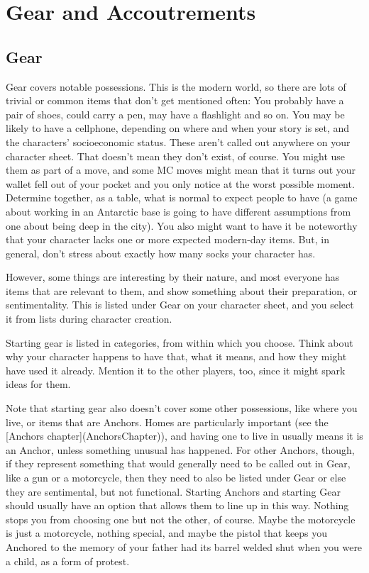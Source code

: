 \documentclass[
  oneside,
  statementpaper,
  9pt]{memoir}
\begin{document}
\newpage

\label{Gear and Accoutrements chapter}

\hypertarget{gear-and-accoutrements-1}{%
\chapter{Gear and Accoutrements}\label{gear-and-accoutrements-1}}

\hypertarget{gear}{%
\section{Gear}\label{gear}}

\begin{Player}

Gear covers notable possessions. This is the modern world, so there are lots of trivial or common items that don’t get mentioned often: You probably have a pair of shoes, could carry a pen, may have a flashlight and so on. You may be likely to have a cellphone, depending on where and when your story is set, and the characters' socioeconomic status. These aren’t called out anywhere on your character sheet. That doesn’t mean they don’t exist, of course. You might use them as part of a move, and some MC moves might mean that it turns out your wallet fell out of your pocket and you only notice at the worst possible moment. Determine together, as a table, what is normal to expect people to have (a game about working in an Antarctic base is going to have different assumptions from one about being deep in the city). You also might want to have it be noteworthy that your character lacks one or more expected modern-day items. But, in general, don’t stress about exactly how many socks your character has.

However, some things are interesting by their nature, and most everyone has items that are relevant to them, and show something about their preparation, or sentimentality. This is listed under Gear on your character sheet, and you select it from lists during character creation.

Starting gear is listed in categories, from within which you choose. Think about why your character happens to have that, what it means, and how they might have used it already. Mention it to the other players, too, since it might spark ideas for them.

Note that starting gear also doesn’t cover some other possessions, like where you live, or items that are Anchors. Homes are particularly important (see the [Anchors chapter](AnchorsChapter)), and having one to live in usually means it is an Anchor, unless something unusual has happened. For other Anchors, though, if they represent something that would generally need to be called out in Gear, like a gun or a motorcycle, then they need to also be listed under Gear or else they are sentimental, but not functional. Starting Anchors and starting Gear should usually have an option that allows them to line up in this way. Nothing stops you from choosing one but not the other, of course. Maybe the motorcycle is just a motorcycle, nothing special, and maybe the pistol that keeps you Anchored to the memory of your father had its barrel welded shut when you were a child, as a form of protest.


\end{Player}
\end{document}
